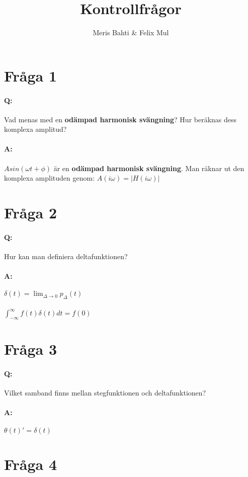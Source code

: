 \documentclass[a4paper]{article}
\title{Kontrollfrågor}
\author{Meris Bahti & Felix Mul}
\begin{document}
\maketitle
\newpage
\section{Fråga 1}
\paragraph{Q:} Vad menas med en \textbf{odämpad harmonisk svängning}? Hur beräknas dess komplexa amplitud?
\paragraph{A:} $Asin(\omega t + \phi)$ är en \textbf{odämpad harmonisk svängning}. Man räknar ut den komplexa amplituden genom: $A(i\omega)=|H(i\omega)|$

\section{Fråga 2}
\paragraph{Q:} Hur kan man definiera deltafunktionen?
\paragraph{A:} $\delta(t)=\lim_{\Delta \rightarrow 0}p_\Delta(t)$
\\
\\
$\int_{-\infty}^{\infty} f(t)\delta(t)dt=f(0)$

\section{Fråga 3}
\paragraph{Q:} Vilket samband finns mellan stegfunktionen och deltafunktionen?
\paragraph{A:} $\theta(t)' = \delta(t)$

\section{Fråga 4}
\end{document}
